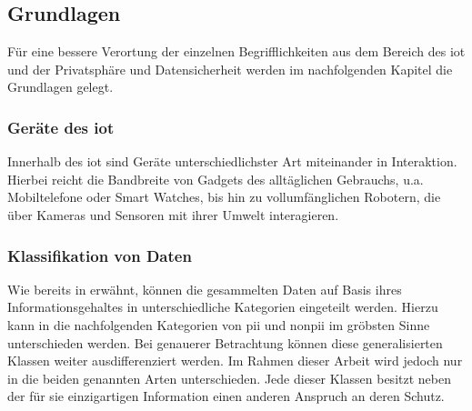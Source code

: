 \subsection{Grundlagen}
\label{sec:Einleitung:ssec:Grundlagen}

Für eine bessere Verortung der einzelnen Begrifflichkeiten aus dem Bereich des \acs{iot} und der Privatsphäre und Datensicherheit werden im nachfolgenden Kapitel die Grundlagen gelegt.

\subsubsection{Geräte des \acl{iot}}
\label{sec:Einleitung:ssec:Grundlagen:sssec:Geräte des Internet of Things}
Innerhalb des \acl{iot} sind Geräte unterschiedlichster Art miteinander in Interaktion. Hierbei reicht die Bandbreite von Gadgets des alltäglichen Gebrauchs, u.a. Mobiltelefone oder Smart Watches, bis hin zu vollumfänglichen Robotern, die über Kameras und Sensoren mit ihrer Umwelt interagieren.

\subsubsection{Klassifikation von Daten}
\label{sec:Einleitung:ssec:Grundlagen:sssec:Klassifikation von Daten}
Wie bereits in  erwähnt, können die gesammelten Daten auf Basis ihres Informationsgehaltes in unterschiedliche Kategorien eingeteilt werden. Hierzu kann in die nachfolgenden Kategorien von \ac{pii} und \ac{nonpii} im gröbsten Sinne unterschieden werden. Bei genauerer Betrachtung können diese generalisierten Klassen weiter ausdifferenziert werden. Im Rahmen dieser Arbeit wird jedoch nur in die beiden genannten Arten unterschieden. Jede dieser Klassen besitzt neben der für sie einzigartigen Information einen anderen Anspruch an deren Schutz.

